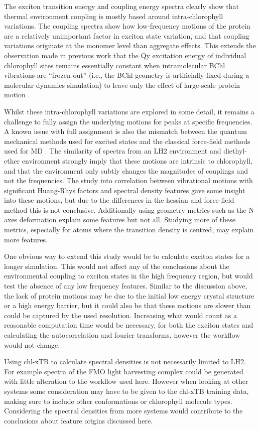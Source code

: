 The exciton transition energy and coupling energy spectra clearly show that thermal
environment coupling is mostly based around intra-chlorophyll variations. The coupling
spectra show how low-frequency motions of the protein are a relatively unimportant 
factor in exciton state variation, and that coupling variations originate at the
monomer level than aggregate effects. This extends the observation made in previous
work that the Qy excitation energy of individual chlorophyll sites remains essentially 
constant when intramolecular BChl vibrations are “frozen out” (i.e., the BChl geometry
is artificially fixed during a molecular dynamics simulation) to leave only the 
effect of large-scale protein motion \cite{Claridge2018a}.

Whilst these intra-chlorophyll variations are explored in some detail, it remains
a challenge to fully assign the underlying motions for peaks at specific frequencies.
A known issue with full assignment is also the mismatch between the quantum mechanical
methods used for excited states and the classical force-field methods used for MD \cite{Zuehlsdorff2022}.
The similarity of spectra from an LH2 environment and diethyl-ether environment 
strongly imply that these motions are intrinsic to chlorophyll, and that the environment
only subtly changes the magnitudes of couplings and not the frequencies. The study
into correlation between vibrational motions with significant Huang-Rhys factors 
and spectral density features gave some insight into these motions, but due to the
differences in the hessian and force-field method this is not conclusive. Additionally 
using geometry metrics such as the N axes deformation explain some features but not
all. Studying more of these metrics, especially for atoms where the transition density
is centred, may explain more features.

One obvious way to extend this study would be to calculate exciton states for a 
longer simulation. This would not affect any of the conclusions about the environmental
coupling to exciton states in the high frequency region, but would test the absence
of any low frequency features. Similar to the discussion above, the lack of protein 
motions may be due to the initial low energy crystal structure or a high energy 
barrier, but it could also be that these motions are slower than could be captured 
by the used resolution. Increasing what would count as a reasonable computation 
time would be necessary, for both the exciton states and calculating the autocorrelation 
and fourier transforms, however the workflow would not change.

Using chl-xTB to calculate spectral densities is not necessarily limited to LH2.
For example spectra of the FMO light harvesting complex could be generated with
little alteration to the workflow used here. However when looking at other systems 
some consideration may have to be given to the chl-xTB training data, making sure
to include other conformations or chlorophyll molecule types. Considering the spectral
densities from more systems would contribute to the conclusions about feature origins
discussed here.